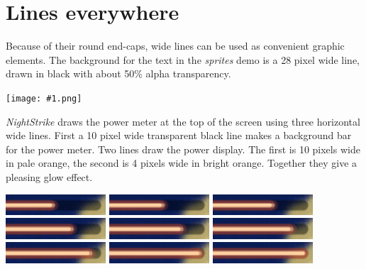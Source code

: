 \documentclass[10pt]{book}
\newcommand{\png}[1]{
\begin{center}
\texttt{[image: \#1.png]}
\end{center}
}
\begin{document}
\newpage
\section{Lines everywhere}

Because of their round end-caps, wide lines can be used as convenient graphic elements.
The background for the text in the \textit{sprites} demo is a 28 pixel wide line,
drawn in black with about 50\% alpha transparency.
\png{lines-el}

\textit{NightStrike} draws the power meter at the top of the screen
using three horizontal wide lines.
First a 10 pixel wide transparent black line makes a background bar for the power meter.
Two lines draw the power display.
The first is 10 pixels wide in pale orange, the second is 4 pixels wide in bright orange.
Together they give a pleasing glow effect.

\begin{center}
\includegraphics[width=0.28\textwidth]{ns-pwr-0000.png}
\includegraphics[width=0.28\textwidth]{ns-pwr-0001.png}
\includegraphics[width=0.28\textwidth]{ns-pwr-0002.png}
\includegraphics[width=0.28\textwidth]{ns-pwr-0003.png}
\includegraphics[width=0.28\textwidth]{ns-pwr-0004.png}
\includegraphics[width=0.28\textwidth]{ns-pwr-0005.png}
\includegraphics[width=0.28\textwidth]{ns-pwr-0006.png}
\includegraphics[width=0.28\textwidth]{ns-pwr-0007.png}
\includegraphics[width=0.28\textwidth]{ns-pwr-0008.png}
\end{center}
\end{document}
